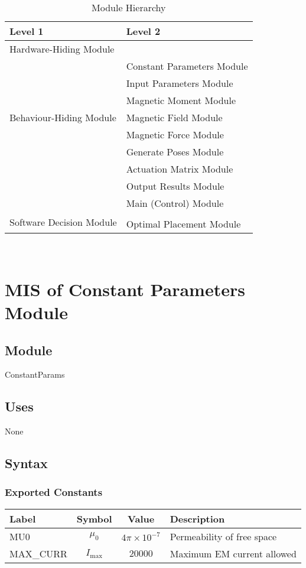 \documentclass[12pt, titlepage]{article}
\begin{document}
\begin{table}[h!]
\centering
\begin{tabular}{p{} p{}}
\toprule
\textbf{Level 1} & \textbf{Level 2}\\
\midrule

{Hardware-Hiding Module} & ~ \\
\midrule

\multirow{7}{0.3\textwidth}{Behaviour-Hiding Module} & Constant Parameters Module\\
& Input Parameters Module\\
& Magnetic Moment Module\\
& Magnetic Field Module\\
& Magnetic Force Module\\
& Generate Poses Module\\
& Actuation Matrix Module\\
& Output Results Module\\ 
& Main (Control) Module\\
\midrule

\multirow{3}{0.3\textwidth}{Software Decision Module} & \\
& Optimal Placement Module\\
\bottomrule

\end{tabular}
\caption{Module Hierarchy}
\label{TblMH}
\end{table}

\newpage
~\newpage

\section{MIS of Constant Parameters Module} \label{MISConsParam}
\subsection{Module}
ConstantParams

\subsection{Uses}
None

\subsection{Syntax}
\subsubsection{Exported Constants}
\begin{center}
  \begin{tabular}{ >{\raggedright\arraybackslash}p{4cm} | c | c | p{6cm} }
    \textbf{Label} & \textbf{Symbol} & \textbf{Value} & \textbf{Description} \\
    \hline
    MU0 & $\mu_0$ & $4\pi\times10^{-7}$ & Permeability of free space \\
    \hline
    MAX\_CURR & $I_{\max}$ & $20000$ & Maximum EM current allowed
  \end{tabular}
  \end{center}
\end{document}
